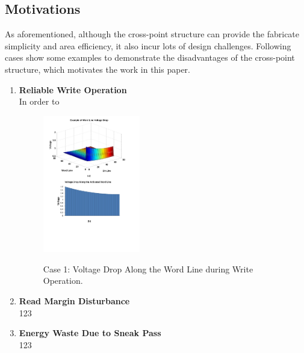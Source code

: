 \subsection{Motivations}
As aforementioned, although the cross-point structure can provide the fabricate simplicity and area efficiency, it also incur lots of design challenges. Following cases show some examples to demonstrate the disadvantages of the cross-point structure, which motivates the work in this paper.
\begin{enumerate}
  \item \textbf{Reliable Write Operation}\\
  In order to

\begin{figure}
\centering
  \includegraphics[width=0.4\textwidth]{./figures/example1_large.pdf}\\
  \caption{Case 1: Voltage Drop Along the Word Line during Write Operation.}\label{fig:exampl1}
\end{figure}

  \item \textbf{Read Margin Disturbance}\\
  123
  \item \textbf{Energy Waste Due to Sneak Pass}\\
  123
\end{enumerate}

~\cite{crossbar_NANO08_Nauenheim}~\cite{memristor:analog}~\cite{moore}

